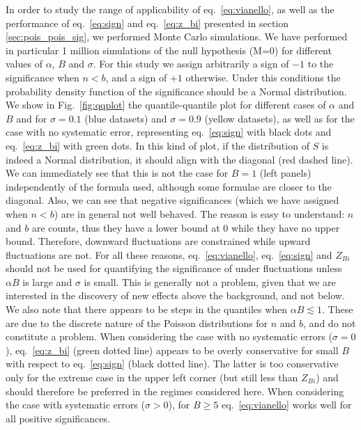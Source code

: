 \documentclass[twocolumn]{aastex61}
\renewcommand{\textbf}{}
\begin{document}
In order to study the range of applicability of eq.~\ref{eq:vianello}, as well as the performance of eq.~\ref{eq:sign} and eq.~\ref{eq:z_bi} presented in section \ref{sec:pois_pois_sig}, we performed Monte Carlo simulations. We have performed in particular 1 million simulations of the null hypothesis (M=0) for different values of $\alpha$, $B$ and $\sigma$. For this study we assign arbitrarily a sign of $-1$ to the significance when $n < b$, and a sign of $+1$ otherwise. Under this conditions the probability density function of the significance should be a Normal distribution. We show in Fig.~\ref{fig:qqplot} the quantile-quantile plot for different cases of $\alpha$ and $B$ and for $\sigma=0.1$ (blue datasets) and $\sigma=0.9$ (yellow datasets), as well as for the case with no systematic error, representing eq.~\ref{eq:sign} with black dots and eq.~\ref{eq:z_bi} with green dots. In this kind of plot, if the distribution of $S$ is indeed a Normal distribution, it should align with the diagonal (red dashed line). We can immediately see that this is not the case for $B=1$ (left panels) independently of the formula used, although some formulae are closer to the diagonal. Also, we can see that negative significances (which we have assigned when $n < b$) are in general not well behaved. The reason is easy to understand: $n$ and $b$ are counts, thus they have a lower bound at 0 while they have no upper bound. Therefore, downward fluctuations are constrained while upward fluctuations are not. For all these reasons, eq.~\ref{eq:vianello}, eq.~\ref{eq:sign} and $Z_{Bi}$ should not be used for quantifying the significance of under fluctuations unless $\alpha B$ is large and $\sigma$ is small. This is generally not a problem, given that we are interested in the discovery of new effects above the background, and not below. We also note that there appears to be steps in the quantiles when $\alpha B \lesssim 1$. These are due to the discrete nature of the Poisson distributions for $n$ and $b$, and do not constitute a problem. \textbf{When considering the case with no systematic errors ($\sigma = 0$), eq.~\ref{eq:z_bi} (green dotted line) appears to be overly conservative for small $B$ with respect to eq.~\ref{eq:sign} (black dotted line). The latter is too conservative only for the extreme case in the upper left corner (but still less than $Z_{Bi}$) and should therefore be preferred in the regimes considered here. When considering the case with systematic errors ($\sigma > 0$), for $B \ge 5$ eq.~\ref{eq:vianello} works well for all positive significances.}
\end{document}
